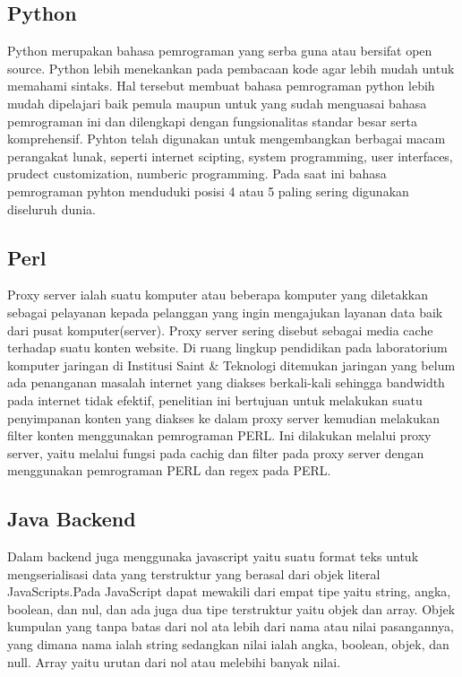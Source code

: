 \subsection{Python}
Python merupakan  bahasa pemrograman yang serba guna atau bersifat open source. Python lebih menekankan pada pembacaan  kode agar lebih mudah untuk memahami sintaks. Hal tersebut membuat bahasa pemrograman python lebih mudah dipelajari baik pemula maupun untuk yang sudah menguasai bahasa pemrograman ini dan dilengkapi dengan fungsionalitas standar besar serta komprehensif. Pyhton telah digunakan untuk mengembangkan berbagai macam perangakat lunak, seperti internet scipting, system programming, user interfaces, prudect customization, numberic programming. Pada saat ini bahasa pemrograman pyhton menduduki posisi 4 atau 5 paling sering digunakan diseluruh dunia.

\subsection{Perl}
Proxy server ialah suatu komputer atau beberapa komputer yang diletakkan sebagai pelayanan kepada pelanggan yang ingin mengajukan layanan data baik dari pusat komputer(server).
Proxy server sering disebut sebagai media cache terhadap suatu konten website. Di ruang lingkup pendidikan pada laboratorium komputer jaringan di Institusi Saint & Teknologi ditemukan jaringan yang belum ada penanganan masalah internet yang diakses berkali-kali sehingga bandwidth pada internet tidak efektif, penelitian ini bertujuan  untuk melakukan suatu penyimpanan konten yang diakses ke dalam proxy server kemudian melakukan filter konten menggunakan pemrograman PERL.
Ini dilakukan melalui proxy server, yaitu melalui fungsi pada cachig dan filter pada proxy server dengan menggunakan pemrograman PERL dan regex pada PERL.


\subsection{Java Backend}
Dalam backend juga menggunaka javascript yaitu suatu format teks untuk mengserialisasi data yang terstruktur yang berasal dari objek literal JavaScripts.Pada JavaScript dapat mewakili dari empat tipe yaitu string, angka, boolean, dan nul, dan ada juga dua tipe terstruktur yaitu objek dan array. Objek kumpulan yang tanpa batas dari nol ata lebih dari nama atau nilai pasangannya, yang dimana nama ialah string sedangkan nilai ialah angka, boolean, objek, dan null. Array yaitu urutan dari nol atau melebihi banyak nilai.

